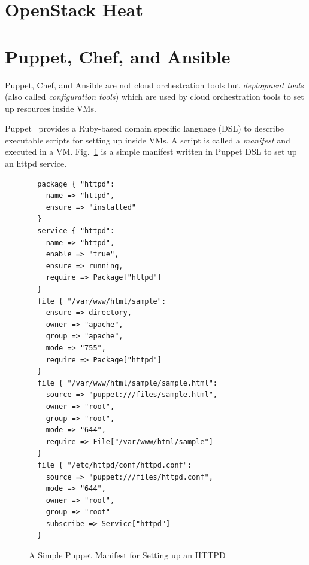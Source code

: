 \documentclass[12pt]{report}
\begin{document}
\section{OpenStack Heat}
\label{sec:heat}

\section{Puppet, Chef, and Ansible}
\label{sec:PCA}
Puppet, Chef, and Ansible are not cloud orchestration tools but {\it
  deployment tools} (also called {\it configuration tools}) which are
used by cloud orchestration tools to set up resources inside VMs.

Puppet~\cite{Puppet} provides a Ruby-based domain specific language (DSL)
to describe executable scripts for setting up inside VMs. A script is
called a {\it manifest} and executed in a VM. 
Fig.~\ref{fig:PuppetExample} is a simple manifest written in Puppet DSL to
set up an httpd service.
\begin{figure}
\small
\begin{verbatim}
  package { "httpd":
    name => "httpd",
    ensure => "installed"
  }
  service { "httpd":
    name => "httpd",
    enable => "true",
    ensure => running,
    require => Package["httpd"]
  }
  file { "/var/www/html/sample":
    ensure => directory,
    owner => "apache",
    group => "apache",
    mode => "755",
    require => Package["httpd"]
  }
  file { "/var/www/html/sample/sample.html":
    source => "puppet:///files/sample.html",
    owner => "root",
    group => "root",
    mode => "644",
    require => File["/var/www/html/sample"]
  }
  file { "/etc/httpd/conf/httpd.conf":
    source => "puppet:///files/httpd.conf",
    mode => "644",
    owner => "root",
    group => "root"
    subscribe => Service["httpd"]
  }
\end{verbatim}
\normalsize
\vspace{-0.6cm}
\caption{A Simple Puppet Manifest for Setting up an HTTPD}
\label{fig:PuppetExample}
\end{figure}
\end{document}
